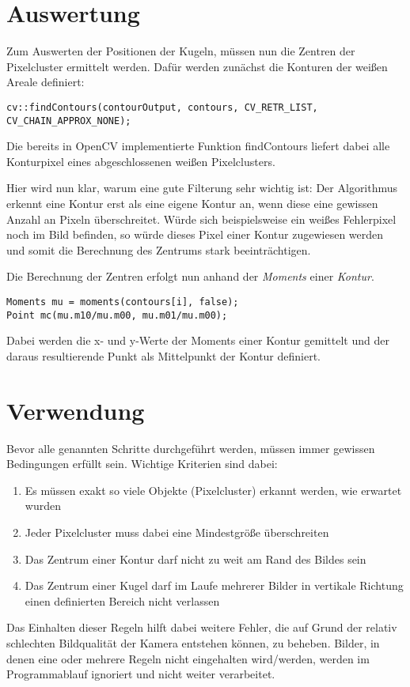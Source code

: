\documentclass[12pt]{article}
\begin{document}
\section{Auswertung}
Zum Auswerten der Positionen der Kugeln, müssen nun die Zentren der Pixelcluster ermittelt werden. Dafür werden zunächst die Konturen der weißen Areale definiert:
\begin{lstlisting}
cv::findContours(contourOutput, contours, CV_RETR_LIST, CV_CHAIN_APPROX_NONE);
\end{lstlisting}
Die bereits in OpenCV implementierte Funktion findContours liefert dabei alle Konturpixel eines abgeschlossenen weißen Pixelclusters. 

Hier wird nun klar, warum eine gute Filterung sehr wichtig ist: Der Algorithmus erkennt eine Kontur erst als eine eigene Kontur an, wenn diese eine gewissen Anzahl an Pixeln überschreitet. Würde sich beispielsweise ein weißes Fehlerpixel noch im Bild befinden, so würde dieses Pixel einer Kontur zugewiesen werden und somit die Berechnung des Zentrums stark beeinträchtigen.

Die Berechnung der Zentren erfolgt nun anhand der \emph{Moments} einer \emph{Kontur}.
\begin{lstlisting}
Moments mu = moments(contours[i], false);
Point mc(mu.m10/mu.m00, mu.m01/mu.m00);
\end{lstlisting}
Dabei werden die x- und y-Werte der Moments einer Kontur gemittelt und der daraus resultierende Punkt als Mittelpunkt der Kontur definiert.
\section{Verwendung}
Bevor alle genannten Schritte durchgeführt werden, müssen immer gewissen Bedingungen erfüllt sein. Wichtige Kriterien sind dabei:
\begin{enumerate}
\item Es müssen exakt so viele Objekte (Pixelcluster) erkannt werden, wie erwartet wurden
\item Jeder Pixelcluster muss dabei eine Mindestgröße überschreiten
\item Das Zentrum einer Kontur darf nicht zu weit am Rand des Bildes sein
\item Das Zentrum einer Kugel darf im Laufe mehrerer Bilder in vertikale Richtung einen definierten Bereich nicht verlassen
\end{enumerate}
Das Einhalten dieser Regeln hilft dabei weitere Fehler, die auf Grund der relativ schlechten Bildqualität der Kamera entstehen können, zu beheben. Bilder, in denen eine oder mehrere Regeln nicht eingehalten wird/werden, werden im Programmablauf ignoriert und nicht weiter verarbeitet.
\end{document}
